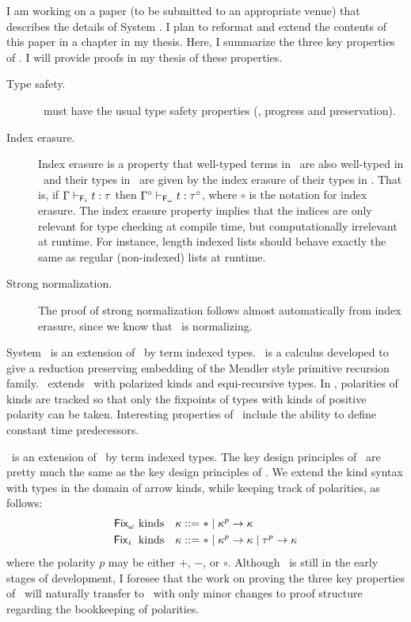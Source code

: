 I am working on a paper (to be submitted to an appropriate venue) that
describes the details of System \Fi. I plan to reformat and extend
the contents of this paper in a chapter in my thesis. Here, I summarize
the three key properties of \Fi. I will provide proofs in my thesis of
these properties.
\begin{description}
\item[\quad Type safety.]
\Fi\ must have the usual type safety properties (\ie, progress and preservation).

\item[\quad Index erasure.]
Index erasure is a property that well-typed terms in \Fi\ are also 
well-typed in \Fw\, and their types in \Fw\ are given by the index erasure
of their types in \Fi. That is, if $\Gamma |-_{\mathsf{F}_i} t : \tau$ then
$\Gamma^\circ |-_{\mathsf{F}_\omega} t : \tau^\circ$, where $\circ$ is the notation
for index erasure. The index erasure property implies that the indices are
only relevant for type checking at compile time, but computationally irrelevant
at runtime. For instance, length indexed lists should behave exactly the same as
regular (non-indexed) lists at runtime.

\item[\quad Strong normalization.]
The proof of strong normalization follows almost automatically from
index erasure, since we know that \Fw\ is normalizing.
\end{description}

System \Fixi\ is an extension of \Fixw\ by term indexed types. \Fixw\ is a
calculus developed to give a reduction preserving embedding of the Mendler
style primitive recursion family. \Fixw\ extends \Fw\ with polarized kinds
and equi-recursive types. In \Fixi, polarities of kinds are tracked so that
only the fixpoints of types with kinds of positive polarity can be taken.
Interesting properties of \Fixw\ include the ability to define constant
time predecessors.

\Fixi\ is an extension of \Fixw\ by term indexed types. The key design principles
of \Fixi\ are pretty much the same as the key design principles of \Fi.
We extend the kind syntax with types in the domain of arrow kinds,
while keeping track of polarities, as follows:
\begin{align*}
\text{\ensuremath{\mathsf{Fix}_\omega}\ kinds} ~~~ \kappa ::= ~ & * \mid \kappa^p -> \kappa \\
\text{\ensuremath{\mathsf{Fix}_i}\; kinds}~~~ \kappa ::= ~ & * \mid \kappa^p -> \kappa \mid \tau^p -> \kappa
\end{align*}
where the polarity $p$ may be either $+$, $-$, or $\circ$.
Although \Fixi\ is still in the early stages of development, I foresee 
that the work on proving the three key properties of \Fi\ will
naturally transfer to \Fixi\ with only minor changes to proof structure
regarding the bookkeeping of polarities.

